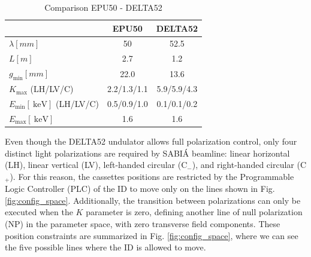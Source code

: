 \documentclass[a4paper,
               keeplastbox,   %
               ]{jacow}
\begin{document}

\begin{table}[h]
\centering
\caption{Comparison EPU50 - DELTA52}
\begin{tabular}{lcc}
\toprule
                      & EPU50  & DELTA52  \\ \midrule
$\lambda \unit{[mm]}$ & 50    & 52.5    \\ 
$L \unit{[m]}$        & 2.7   & 1.2     \\ 
$g_\text{min} \unit{[mm]}$ & 22.0  & 13.6    \\ 
$K_\text{max}$ (LH/LV/C)   & 2.2/1.3/1.1   & 5.9/5.9/4.3     \\
$E_\text{min} [\SI{}{\kilo\electronvolt}]$ (LH/LV/C)  & 0.5/0.9/1.0   & 0.1/0.1/0.2     \\
$E_\text{max} [\SI{}{\kilo\electronvolt}]$            & 1.6   & 1.6     \\ \bottomrule
\end{tabular}
\label{table1}
\end{table}

Even though the DELTA52 undulator allows full polarization control, only four distinct light polarizations are required by SABIÁ beamline: linear horizontal (LH), linear vertical (LV), left-handed circular (C$_-$), and right-handed circular (C$_+$). For this reason, the cassettes positions are restricted by the Programmable Logic Controller (PLC) of the ID to move only on the lines shown in Fig. \ref{fig:config_space}. Additionally, the transition between polarizations can only be executed when the $K$ parameter is zero, defining another line of null polarization (NP) in the parameter space, with zero transverse field components. These position constraints are summarized in Fig. \ref{fig:config_space}, where we can see the five possible lines where the ID is allowed to move.
\end{document}
